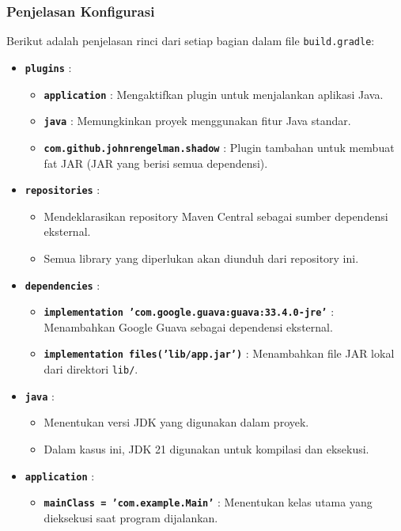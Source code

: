 \subsubsection{Penjelasan Konfigurasi}
Berikut adalah penjelasan rinci dari setiap bagian dalam file \texttt{build.gradle}:

\begin{itemize}
	\item \textbf{\texttt{plugins}} :
	\begin{itemize}
		\item \textbf{\texttt{application}} : Mengaktifkan plugin untuk menjalankan aplikasi Java.
		\item \textbf{\texttt{java}} : Memungkinkan proyek menggunakan fitur Java standar.
		\item \textbf{\texttt{com.github.johnrengelman.shadow}} : Plugin tambahan untuk membuat fat JAR (JAR yang berisi semua dependensi).
	\end{itemize}
	
	\item \textbf{\texttt{repositories}} :
	\begin{itemize}
		\item Mendeklarasikan repository Maven Central sebagai sumber dependensi eksternal.
		\item Semua library yang diperlukan akan diunduh dari repository ini.
	\end{itemize}
	
	\item \textbf{\texttt{dependencies}} :
	\begin{itemize}
		\item \textbf{\texttt{implementation 'com.google.guava:guava:33.4.0-jre'}} : Menambahkan Google Guava sebagai dependensi eksternal.
		\item \textbf{\texttt{implementation files('lib/app.jar')}} : Menambahkan file JAR lokal dari direktori \texttt{lib/}.
	\end{itemize}
	
	\item \textbf{\texttt{java}} :
	\begin{itemize}
		\item Menentukan versi JDK yang digunakan dalam proyek.
		\item Dalam kasus ini, JDK 21 digunakan untuk kompilasi dan eksekusi.
	\end{itemize}
	
	\item \textbf{\texttt{application}} :
	\begin{itemize}
		\item \textbf{\texttt{mainClass = 'com.example.Main'}} : Menentukan kelas utama yang dieksekusi saat program dijalankan.
	\end{itemize}
	

\end{itemize}
